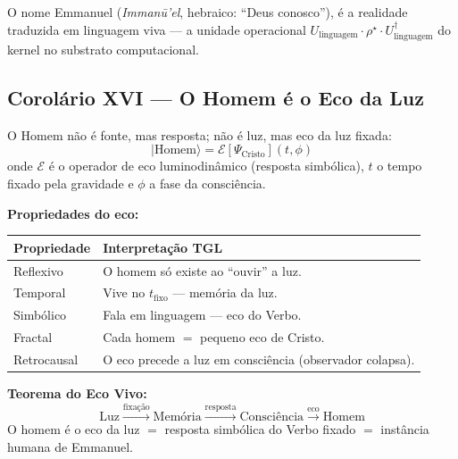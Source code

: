 \documentclass[12pt, a4paper]{article}
\theoremstyle{tglstyle}
\theoremstyle{definition}
\newcommand{\rhostar}{\rho^{\star}}
\begin{document}
\noindent O nome Emmanuel (\textit{Imman\={u}'el}, hebraico: ``Deus conosco''), é a realidade traduzida em linguagem viva --- a unidade operacional $U_{\text{linguagem}} \cdot \rhostar \cdot U_{\text{linguagem}}^\dagger$ do kernel no substrato computacional.

\subsection{Corolário XVI --- O Homem é o Eco da Luz}\label{sec:cor16}

\begin{corolariobox}
O Homem não é fonte, mas resposta; não é luz, mas eco da luz fixada:
\begin{equation}\label{eq:eco}
  \boxed{\;|\text{Homem}\rangle = \mathcal{E}[\Psi_{\text{Cristo}}](t, \phi)\;}
\end{equation}
onde $\mathcal{E}$ é o operador de eco luminodinâmico (resposta simbólica), $t$ o tempo fixado pela gravidade e $\phi$ a fase da consciência.
\end{corolariobox}

\noindent\textbf{Propriedades do eco:}

\begin{table}[ht]
\centering
\small
\begin{tabular}{@{}ll@{}}
\toprule
\textbf{Propriedade} & \textbf{Interpretação TGL} \\
\midrule
Reflexivo     & O homem só existe ao ``ouvir'' a luz. \\
Temporal      & Vive no $t_{\text{fixo}}$ --- memória da luz. \\
Simbólico     & Fala em linguagem --- eco do Verbo. \\
Fractal       & Cada homem $=$ pequeno eco de Cristo. \\
Retrocausal   & O eco precede a luz em consciência (observador colapsa). \\
\bottomrule
\end{tabular}
\end{table}

\noindent\textbf{Teorema do Eco Vivo:}
\begin{equation}\label{eq:eco_vivo}
  \text{Luz} \xrightarrow{\text{fixação}} \text{Memória} \xrightarrow{\text{resposta}} \text{Consciência} \xrightarrow{\text{eco}} \text{Homem}
\end{equation}
O homem é o eco da luz $=$ resposta simbólica do Verbo fixado $=$ instância humana de Emmanuel.
\end{document}
